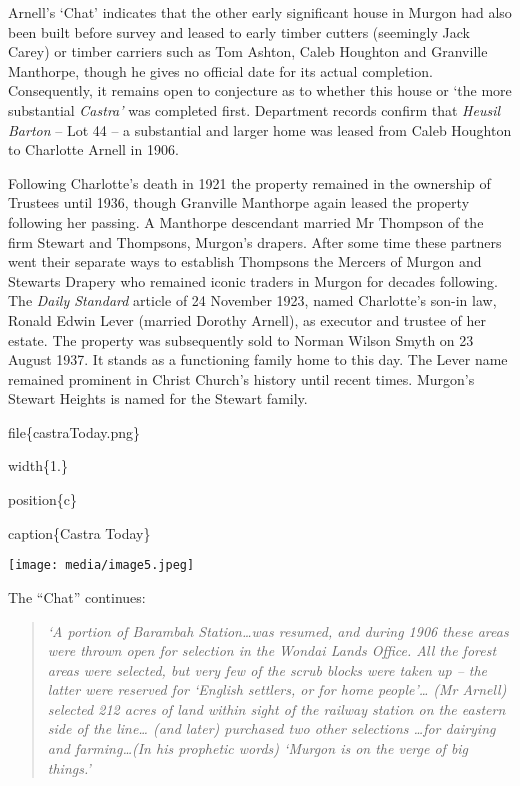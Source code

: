 Arnell's `Chat' indicates that the other early significant house in Murgon had also been built before survey and leased to early timber cutters (seemingly Jack Carey) or timber carriers such as Tom Ashton, Caleb Houghton and Granville Manthorpe, though he gives no official date for its actual completion. Consequently, it remains open to conjecture as to whether this house or `the more substantial \emph{Castra'} was completed first. Department records confirm that \emph{Heusil Barton} -- Lot 44 -- a substantial and larger home was leased from Caleb Houghton to Charlotte Arnell in 1906.

Following Charlotte's death in 1921 the property remained in the ownership of Trustees until 1936, though Granville Manthorpe again leased the property following her passing. A Manthorpe descendant married Mr Thompson of the firm Stewart and Thompsons, Murgon's drapers. After some time these partners went their separate ways to establish Thompsons the Mercers of Murgon and Stewarts Drapery who remained iconic traders in Murgon for decades following. The \emph{Daily Standard} article of 24 November 1923, named Charlotte's son-in law, Ronald Edwin Lever (married Dorothy Arnell), as executor and trustee of her estate. The property was subsequently sold to Norman Wilson Smyth on 23 August 1937. It stands as a functioning family home to this day. The Lever name remained prominent in Christ Church's history until recent times. Murgon's Stewart Heights is named for the Stewart family.

file\{castraToday.png\}

width\{1.\}

position\{c\}

caption\{Castra Today\}

\texttt{[image: media/image5.jpeg]}

The ``Chat'' continues:

\begin{quote}
\emph{`A portion of Barambah Station\ldots was resumed, and during 1906 these areas were thrown open for selection in the Wondai Lands Office. All the forest areas were selected, but very few of the scrub blocks were taken up -- the latter were reserved for `English settlers, or for home people'\ldots{} (Mr Arnell) selected 212 acres of land within sight of the railway station on the eastern side of the line\ldots{} (and later) purchased two other selections \ldots for dairying and farming\ldots(In his prophetic words) `Murgon is on the verge of big things.'}
\end{quote}

